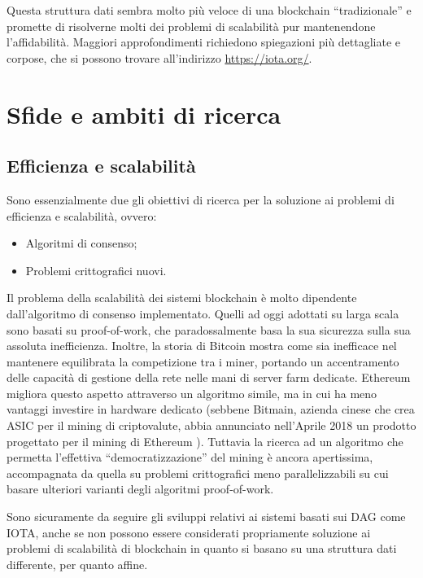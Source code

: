             Questa struttura dati sembra molto più veloce di una blockchain ``tradizionale'' e promette di risolverne molti dei problemi di scalabilità pur mantenendone l'affidabilità. Maggiori approfondimenti richiedono spiegazioni più dettagliate e corpose, che si possono trovare all'indirizzo \url{https://iota.org/}.

\section{Sfide e ambiti di ricerca}

    \subsection{Efficienza e scalabilità}
        Sono essenzialmente due gli obiettivi di ricerca per la soluzione ai problemi di efficienza e scalabilità, ovvero:
        \begin{itemize}
            \item Algoritmi di consenso;
            \item Problemi crittografici nuovi.
        \end{itemize}
        Il problema della scalabilità dei sistemi blockchain è molto dipendente dall'algoritmo di consenso implementato. Quelli ad oggi adottati su larga scala sono basati su proof-of-work, che paradossalmente basa la sua sicurezza sulla sua assoluta inefficienza. Inoltre, la storia di Bitcoin mostra come sia inefficace nel mantenere equilibrata la competizione tra i miner, portando un accentramento delle capacità di gestione della rete nelle mani di server farm dedicate. Ethereum migliora questo aspetto attraverso un algoritmo simile, ma in cui ha meno vantaggi investire in hardware dedicato (sebbene Bitmain, azienda cinese che crea ASIC per il mining di criptovalute, abbia annunciato nell'Aprile 2018 un prodotto progettato per il mining di Ethereum \cite{Antminer_E3}). Tuttavia la ricerca ad un algoritmo che permetta l'effettiva ``democratizzazione'' del mining è ancora apertissima, accompagnata da quella su problemi crittografici meno parallelizzabili su cui basare ulteriori varianti degli algoritmi proof-of-work.

        Sono sicuramente da seguire gli sviluppi relativi ai sistemi basati sui DAG come IOTA, anche se non possono essere considerati propriamente soluzione ai problemi di scalabilità di blockchain in quanto si basano su una struttura dati differente, per quanto affine.
        
